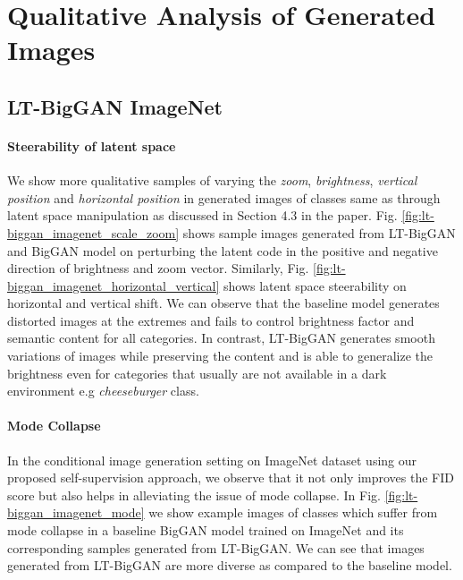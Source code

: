 \documentclass[10pt,twocolumn,letterpaper]{article}
\begin{document}
\section{Qualitative Analysis of Generated Images}
\subsection{LT-BigGAN ImageNet}\label{sec:mode_collapse}

\paragraph{Steerability of latent space}
We show more qualitative samples of varying the \textit{zoom}, \textit{brightness}, \textit{vertical position} and \textit{horizontal position} in generated images of classes same as \cite{controlling2020iclr} through latent space manipulation as discussed in Section 4.3 in the paper. Fig. \ref{fig:lt-biggan_imagenet_scale_zoom} shows sample images generated from LT-BigGAN and BigGAN model on perturbing the latent code in the positive and negative direction of brightness and zoom vector. Similarly, Fig. \ref{fig:lt-biggan_imagenet_horizontal_vertical} shows latent space steerability on horizontal and vertical shift. We can observe that the baseline model generates distorted images at the extremes and fails to control brightness factor and semantic content for all categories. In contrast, LT-BigGAN generates smooth variations of images while preserving the content and is able to generalize the brightness even for categories that usually are not available in a dark environment e.g \textit{cheeseburger} class.  

\paragraph{Mode Collapse} In the conditional image generation setting on ImageNet dataset using our proposed self-supervision approach, we observe that it not only improves the FID score but also helps in alleviating the issue of mode collapse. In Fig. \ref{fig:lt-biggan_imagenet_mode} we show example images of classes which suffer from mode collapse in a baseline BigGAN model trained on ImageNet and its corresponding samples generated from LT-BigGAN. We can see that images generated from LT-BigGAN are more diverse as compared to the baseline model. 
\end{document}
